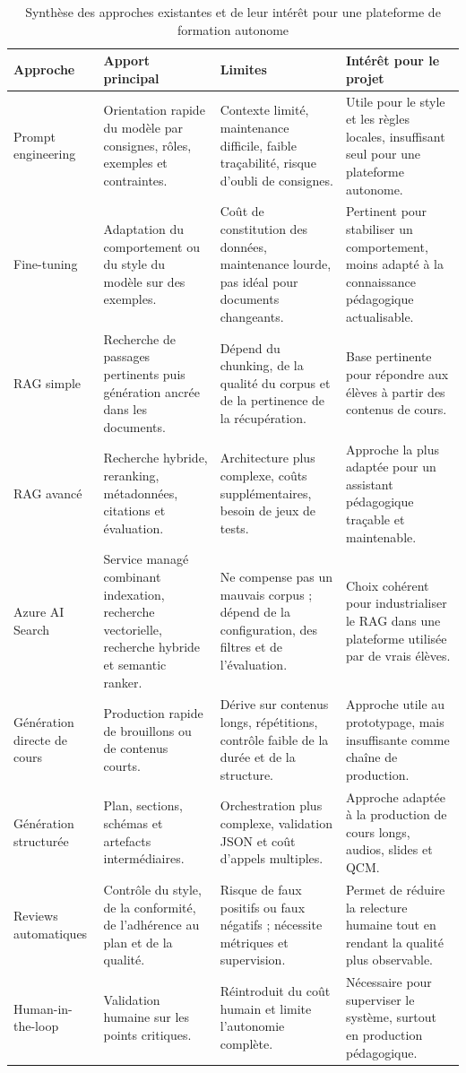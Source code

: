 \documentclass[12pt,a4paper]{article}
\begin{document}
\begin{table}[h]
\centering
\small
\begin{tabular}{|p{3cm}|p{3.4cm}|p{4.2cm}|p{3.4cm}|}
\hline
\textbf{Approche} & \textbf{Apport principal} & \textbf{Limites} & \textbf{Intérêt pour le projet} \\
\hline
Prompt engineering &
Orientation rapide du modèle par consignes, rôles, exemples et contraintes. &
Contexte limité, maintenance difficile, faible traçabilité, risque d'oubli de consignes. &
Utile pour le style et les règles locales, insuffisant seul pour une plateforme autonome. \\
\hline
Fine-tuning &
Adaptation du comportement ou du style du modèle sur des exemples. &
Coût de constitution des données, maintenance lourde, pas idéal pour documents changeants. &
Pertinent pour stabiliser un comportement, moins adapté à la connaissance pédagogique actualisable. \\
\hline
RAG simple &
Recherche de passages pertinents puis génération ancrée dans les documents. &
Dépend du chunking, de la qualité du corpus et de la pertinence de la récupération. &
Base pertinente pour répondre aux élèves à partir des contenus de cours. \\
\hline
RAG avancé &
Recherche hybride, reranking, métadonnées, citations et évaluation. &
Architecture plus complexe, coûts supplémentaires, besoin de jeux de tests. &
Approche la plus adaptée pour un assistant pédagogique traçable et maintenable. \\
\hline
Azure AI Search &
Service managé combinant indexation, recherche vectorielle, recherche hybride et semantic ranker. &
Ne compense pas un mauvais corpus ; dépend de la configuration, des filtres et de l'évaluation. &
Choix cohérent pour industrialiser le RAG dans une plateforme utilisée par de vrais élèves. \\
\hline
Génération directe de cours &
Production rapide de brouillons ou de contenus courts. &
Dérive sur contenus longs, répétitions, contrôle faible de la durée et de la structure. &
Approche utile au prototypage, mais insuffisante comme chaîne de production. \\
\hline
Génération structurée &
Plan, sections, schémas et artefacts intermédiaires. &
Orchestration plus complexe, validation JSON et coût d'appels multiples. &
Approche adaptée à la production de cours longs, audios, slides et QCM. \\
\hline
Reviews automatiques &
Contrôle du style, de la conformité, de l'adhérence au plan et de la qualité. &
Risque de faux positifs ou faux négatifs ; nécessite métriques et supervision. &
Permet de réduire la relecture humaine tout en rendant la qualité plus observable. \\
\hline
Human-in-the-loop &
Validation humaine sur les points critiques. &
Réintroduit du coût humain et limite l'autonomie complète. &
Nécessaire pour superviser le système, surtout en production pédagogique. \\
\hline
\end{tabular}
\caption{Synthèse des approches existantes et de leur intérêt pour une plateforme de formation autonome}
\end{table}
\end{document}

